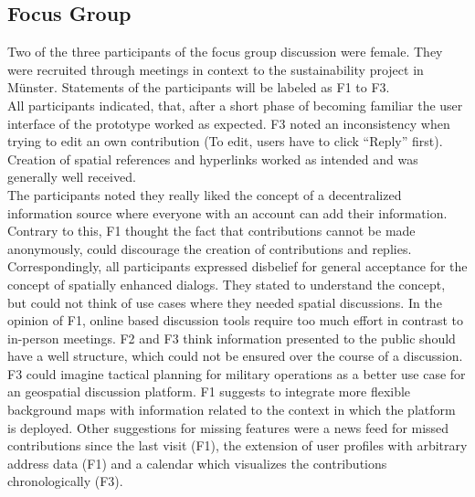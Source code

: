 \subsection{Focus Group}
\label{sub:ev_focus}
Two of the three participants of the focus group discussion were female. They were recruited through meetings in context to the sustainability project in Münster. Statements of the participants will be labeled as F1 to F3.\\
All participants indicated, that, after a short phase of becoming familiar the user interface of the prototype worked as expected. F3 noted an inconsistency when trying to edit an own contribution (To edit, users have to click ``Reply'' first). Creation of spatial references and hyperlinks worked as intended and was generally well received.\\
The participants noted they really liked the concept of a decentralized information source where everyone with an account can add their information. Contrary to this, F1 thought the fact that contributions cannot be made anonymously, could discourage the creation of contributions and replies.\\
Correspondingly, all participants expressed disbelief for general acceptance for the concept of spatially enhanced dialogs. They stated to understand the concept, but could not think of use cases where they needed spatial discussions. In the opinion of F1, online based discussion tools require too much effort in contrast to in-person meetings. F2 and F3 think information presented to the public should have a well structure, which could not be ensured over the course of a discussion. F3 could imagine tactical planning for military operations as a better use case for an geospatial discussion platform. F1 suggests to integrate more flexible background maps with information related to the context in which the platform is deployed. Other suggestions for missing features were a news feed for missed contributions since the last visit (F1), the extension of user profiles with arbitrary address data (F1) and a calendar which visualizes the contributions chronologically (F3).



